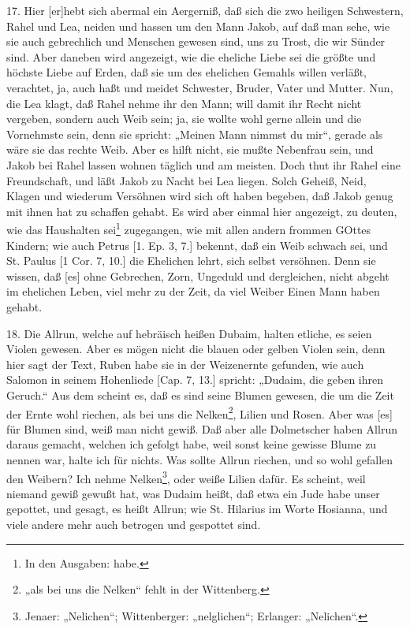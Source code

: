 17. Hier [er]hebt sich abermal ein Aergerniß, daß sich die zwo heiligen Schwestern, Rahel und Lea, neiden und hassen um den Mann Jakob, auf daß man sehe, wie sie auch gebrechlich und Menschen gewesen sind, uns zu Trost, die wir Sünder sind. Aber daneben wird angezeigt, wie die eheliche Liebe sei die größte und höchste Liebe auf Erden, daß sie um des ehelichen Gemahls willen verläßt, verachtet, ja, auch haßt und meidet Schwester, Bruder, Vater und Mutter. Nun, die Lea klagt, daß Rahel nehme ihr den Mann; will damit ihr Recht nicht vergeben, sondern auch Weib sein; ja, sie wollte wohl gerne allein und die Vornehmste sein, denn sie spricht: „Meinen Mann nimmst du mir“, gerade als wäre sie das rechte Weib. Aber es hilft nicht, sie mußte Nebenfrau sein, und Jakob bei Rahel lassen wohnen täglich und am meisten. Doch thut ihr Rahel eine Freundschaft, und läßt Jakob zu Nacht bei Lea liegen. Solch Geheiß, Neid, Klagen und wiederum Versöhnen wird sich oft haben begeben, daß Jakob genug mit ihnen hat zu schaffen gehabt. Es wird aber einmal hier angezeigt, zu deuten, wie das Haushalten sei\footnote{In den Ausgaben: habe.} zugegangen, wie mit allen andern frommen GOttes Kindern; wie auch Petrus [1. Ep. 3, 7.] bekennt, daß ein Weib schwach sei, und St. Paulus [1 Cor. 7, 10.] die Ehelichen lehrt, sich selbst versöhnen. Denn sie wissen, daß [es] ohne Gebrechen, Zorn, Ungeduld und dergleichen, nicht abgeht im ehelichen Leben, viel mehr zu der Zeit, da viel Weiber Einen Mann haben gehabt.

18. Die Allrun, welche auf hebräisch heißen Dubaim, halten etliche, es seien Violen gewesen. Aber es mögen nicht die blauen oder gelben Violen sein, denn hier sagt der Text, Ruben habe sie in der Weizenernte gefunden, wie auch Salomon in seinem Hohenliede [Cap. 7, 13.] spricht: „Dudaim, die geben ihren Geruch.“ Aus dem scheint es, daß es sind seine Blumen gewesen, die um die Zeit der Ernte wohl riechen, als bei uns die Nelken\footnote{„als bei uns die Nelken“ fehlt in der Wittenberg.}, Lilien und Rosen. Aber was [es] für Blumen sind, weiß man nicht gewiß. Daß aber alle Dolmetscher haben Allrun daraus gemacht, welchen ich gefolgt habe, weil sonst keine gewisse Blume zu nennen war, halte ich für nichts. Was sollte Allrun riechen, und so wohl gefallen den Weibern? Ich nehme Nelken\footnote{Jenaer: „Nelichen“; Wittenberger: „nelglichen“; Erlanger: „Nelichen“.}, oder weiße Lilien dafür. Es scheint, weil niemand gewiß gewußt hat, was Dudaim heißt, daß etwa ein Jude habe unser gepottet, und gesagt, es heißt Allrun; wie St. Hilarius im Worte Hosianna, und viele andere mehr auch betrogen und gespottet sind.

